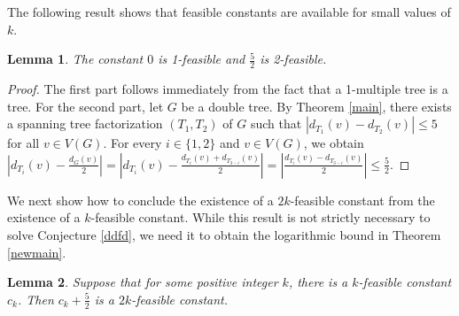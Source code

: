\documentclass{article}
\theoremstyle{plain}
\newtheorem{Lemma}{Lemma}
\theoremstyle{nonumberplain}
\theoremstyle{nonumberplain}
\newcommand{\stf}{spanning tree factorization }
\begin{document}
The following result shows that feasible constants are available for small values of $k$.
\begin{Lemma}\label{rfde}
The constant $0$ is 1-feasible and $\frac{5}{2}$ is 2-feasible.
\end{Lemma}
\begin{proof}
The first part follows immediately from the fact that a 1-multiple tree is a tree. For the second part, let $G$ be a double tree. By Theorem \ref{main}, there exists a \stf $(T_1,T_2)$ of $G$ such that $|d_{T_1}(v)-d_{T_2}(v)|\leq 5$ for all $v \in V(G)$. For every $i \in \{1,2\}$ and $v \in V(G)$, we obtain $|d_{T_i}(v)-\frac{d_G(v)}{2}|=|d_{T_i}(v)-\frac{d_{T_i}(v)+d_{T_{3-i}}(v)}{2}|=|\frac{d_{T_i}(v)-d_{T_{3-i}}(v)}{2}|\leq \frac{5}{2}$.
\end{proof}
We next show how to conclude the existence of a $2k$-feasible constant from the existence of a $k$-feasible constant. While this result is not strictly necessary to solve Conjecture \ref{ddfd}, we need it to obtain the logarithmic bound in Theorem \ref{newmain}.
\begin{Lemma}\label{uhhu}
Suppose that for some positive integer $k$, there is a $k$-feasible constant $c_k$. Then $c_k+\frac{5}{2}$ is a $2k$-feasible constant.
\end{Lemma}
\end{document}
